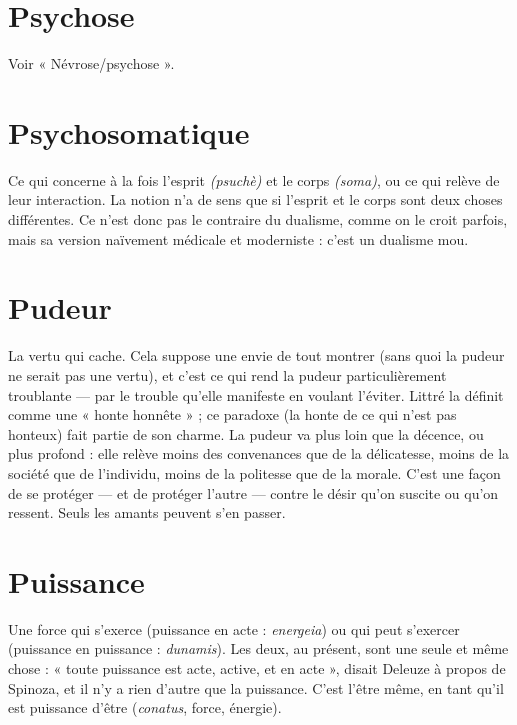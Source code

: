 \section{Psychose}
Voir « Névrose/psychose ».

\section{Psychosomatique}
Ce qui concerne à la fois l'esprit {\it (psuchè)} et le
corps {\it (soma)}, ou ce qui relève de leur interaction.
La notion n’a de sens que si l'esprit et le corps sont deux choses différentes. Ce
n’est donc pas le contraire du dualisme, comme on le croit parfois, mais sa version
naïvement médicale et moderniste : c’est un dualisme mou.

\section{Pudeur}
La vertu qui cache. Cela suppose une envie de tout montrer (sans
quoi la pudeur ne serait pas une vertu), et c’est ce qui rend la
pudeur particulièrement troublante — par le trouble qu’elle manifeste en voulant
l’éviter. Littré la définit comme une « honte honnête » ; ce paradoxe (la
honte de ce qui n’est pas honteux) fait partie de son charme. La pudeur va plus
loin que la décence, ou plus profond : elle relève moins des convenances que de
la délicatesse, moins de la société que de l’individu, moins de la politesse que
de la morale. C’est une façon de se protéger — et de protéger l’autre — contre le
désir qu’on suscite ou qu’on ressent. Seuls les amants peuvent s’en passer.

\section{Puissance}
Une force qui s’exerce (puissance en acte : {\it energeia}) ou qui
peut s'exercer (puissance en puissance : {\it dunamis}). Les deux, au
présent, sont une seule et même chose : « toute puissance est acte, active, et en
acte », disait Deleuze à propos de Spinoza, et il n’y a rien d’autre que la puissance.
C’est l’être même, en tant qu’il est puissance d’être ({\it conatus}, force,
énergie).

